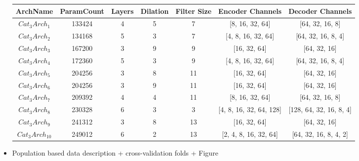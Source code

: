 \documentclass[preprint,12pt]{elsarticle}
\begin{document}
\begin{itemize}
\begin{footnotesize}
\begin{longtable}{ccccccc}
\toprule
\textbf{ArchName} & \textbf{ParamCount} & \textbf{Layers} & \textbf{Dilation} & \textbf{Filter Size} & \textbf{Encoder Channels} & \textbf{Decoder Channels} \\
\midrule
\endhead

\endfoot

\bottomrule
\endlastfoot

$Cat_3Arch_1$ & 133424 & 4 & 5 & 7  & [8, 16, 32, 64]          & [64, 32, 16, 8]  \\
$Cat_3Arch_2$ & 134168 & 5 & 3 & 7  & [4, 8, 16, 32, 64]       & [64, 32, 16, 8, 4] \\
$Cat_3Arch_3$ & 167200 & 3 & 9 & 9  & [16, 32, 64]             & [64, 32, 16]\\
$Cat_3Arch_4$ & 172360 & 5 & 3 & 9  & [4, 8, 16, 32, 64]       & [64, 32, 16, 8, 4] \\
$Cat_3Arch_5$ & 204256 & 3 & 8 & 11 & [16, 32, 64]             & [64, 32, 16] \\
$Cat_3Arch_6$ & 204256 & 3 & 9 & 11 & [16, 32, 64]             & [64, 32, 16]\\
$Cat_3Arch_7$ & 209392 & 4 & 4 & 11 & [8, 16, 32, 64]          & [64, 32, 16, 8] \\
$Cat_3Arch_8$ & 230328 & 6 & 3 & 3  & [4, 8, 16, 32, 64, 128]  & [128, 64, 32, 16, 8, 4]\\
$Cat_3Arch_9$ & 241312 & 3 & 8 & 13 & [16, 32, 64]             & [64, 32, 16] \\
$Cat_3Arch_{10}$ & 249012 & 6 & 2 & 13 & [2, 4, 8, 16, 32, 64]  & [64, 32, 16, 8, 4, 2]\\
\end{longtable}
\end{footnotesize}




    \item Population based data description + cross-validation folds + Figure


\end{itemize}
\end{document}
